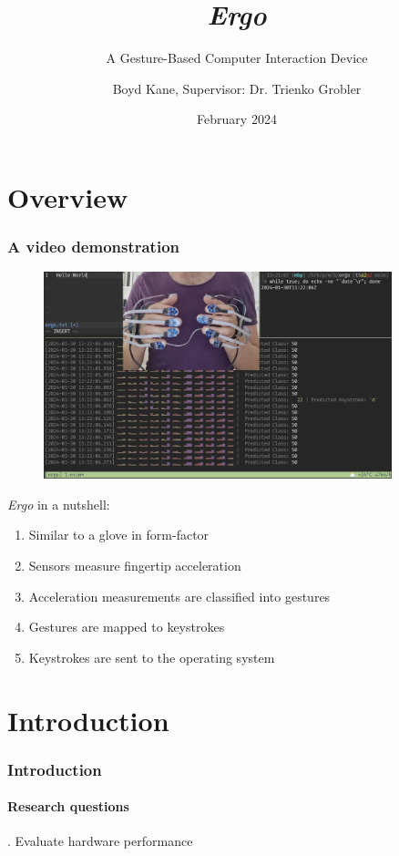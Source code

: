 \documentclass[xcolor={svgnames,table},10pt,fleqn]{beamer}
\title[\emph{Ergo}]{\emph{Ergo}}
\subtitle{A Gesture-Based Computer Interaction Device}
\author{Boyd Kane, Supervisor: Dr. Trienko Grobler}
\institute{Computer Science Division,\\
           Stellenbosch University}
\date{February 2024}
\begin{document}
\begin{frame}
  \maketitle
\end{frame}

\section{Overview}
\begin{frame}
    \frametitle{A video demonstration}
    \begin{figure}[h]
        \centering
        \includegraphics[width=0.9\textwidth]{video_thumbnail.png}
    \end{figure}
    \emph{Ergo} in a nutshell:
    \begin{enumerate}
        \item Similar to a glove in form-factor
        \item Sensors measure fingertip acceleration
        \item Acceleration measurements are classified into gestures
        \item Gestures are mapped to keystrokes
        \item Keystrokes are sent to the operating system
    \end{enumerate}
\end{frame}

\section{Introduction}
\begin{frame}
    \frametitle{Introduction}
    \framesubtitle{Research questions}
    . Evaluate hardware performance
\end{frame}
\end{document}
